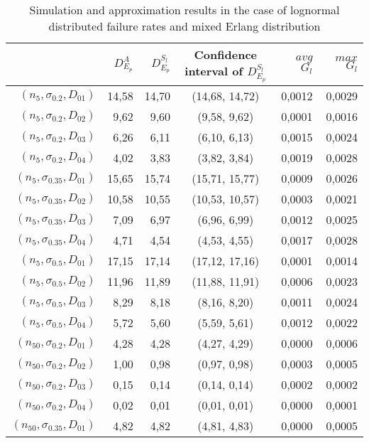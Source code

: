 \documentclass[preprint,12pt]{elsarticle}
\begin{document}
\begin{appendices}
  \begin{table}[htbp]
  \centering
  \caption{Simulation and approximation results in the case of lognormal distributed failure rates and mixed Erlang distribution}
    \begin{tabular}{rrrcrr}
    \toprule
          & $D_{E_{p}}^{A}$ & $D_{E_{p}}^{S_{l}}$ & Confidence interval of $D_{E_{p}}^{S_{l}}$ & $avg$ $G_{l}$ & $max$ $G_{l}$ \\
    \midrule
    $(n_{5},\sigma_{0.2},D_{01})$ & 14,58 & 14,70 & (14,68, 14,72) & 0,0012 & 0,0029 \\
    $(n_{5},\sigma_{0.2},D_{02})$ & 9,62  & 9,60  & (9,58, 9,62) & 0,0001 & 0,0016 \\
   $(n_{5},\sigma_{0.2},D_{03})$ & 6,26  & 6,11  & (6,10, 6,13) & 0,0015 & 0,0024 \\
    $(n_{5},\sigma_{0.2},D_{04})$ & 4,02  & 3,83  & (3,82, 3,84) & 0,0019 & 0,0028 \\
    $(n_{5},\sigma_{0.35},D_{01})$ & 15,65 & 15,74 & (15,71, 15,77) & 0,0009 & 0,0026 \\
    $(n_{5},\sigma_{0.35},D_{02})$ & 10,58 & 10,55 & (10,53, 10,57) & 0,0003 & 0,0021 \\
    $(n_{5},\sigma_{0.35},D_{03})$ & 7,09  & 6,97  & (6,96, 6,99) & 0,0012 & 0,0025 \\
    $(n_{5},\sigma_{0.35},D_{04})$ & 4,71  & 4,54  & (4,53, 4,55) & 0,0017 & 0,0028 \\
    $(n_{5},\sigma_{0.5},D_{01})$ & 17,15 & 17,14 & (17,12, 17,16) & 0,0001 & 0,0014 \\
    $(n_{5},\sigma_{0.5},D_{02})$& 11,96 & 11,89 & (11,88, 11,91) & 0,0006 & 0,0023 \\
    $(n_{5},\sigma_{0.5},D_{03})$& 8,29  & 8,18  & (8,16, 8,20) & 0,0011 & 0,0024 \\
    $(n_{5},\sigma_{0.5},D_{04})$ & 5,72  & 5,60  & (5,59, 5,61) & 0,0012 & 0,0022 \\
    $(n_{50},\sigma_{0.2},D_{01})$ & 4,28  & 4,28  & (4,27, 4,29) & 0,0000 & 0,0006 \\
    $(n_{50},\sigma_{0.2},D_{02})$ & 1,00  & 0,98  & (0,97, 0,98) & 0,0003 & 0,0005 \\
    $(n_{50},\sigma_{0.2},D_{03})$ & 0,15  & 0,14  & (0,14, 0,14) & 0,0002 & 0,0002 \\
    $(n_{50},\sigma_{0.2},D_{04})$ & 0,02  & 0,01  & (0,01, 0,01) & 0,0000 & 0,0001 \\
    $(n_{50},\sigma_{0.35},D_{01})$ & 4,82  & 4,82  & (4,81, 4,83) & 0,0000 & 0,0005 \\

\end{tabular}
\end{table}
\end{appendices}
\end{document}

